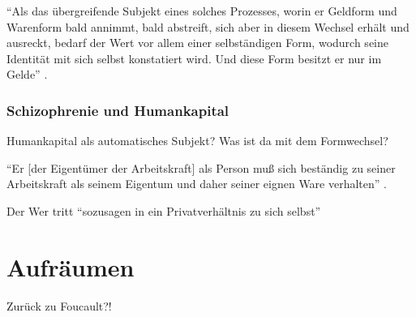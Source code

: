\documentclass[12pt,
               DIV13,
               paper=a4,
               twoside=false,
               onehalfspacing,
               bibliography=totoc,
               toc=graduated,
               draft,
               ]{scrartcl}
\newcommand{\pc}[2]{\parencite[#1]{#2}}
\begin{document}
"`Als das übergreifende Subjekt eines solches Prozesses, worin er
Geldform und Warenform bald annimmt, bald abstreift, sich aber in
diesem Wechsel erhält und ausreckt, bedarf der Wert vor allem einer
selbständigen Form, wodurch seine Identität mit sich selbst
konstatiert wird. Und diese Form besitzt er nur im Gelde"'
\pc{169}{kap}.

\subsubsection{Schizophrenie und Humankapital}

Humankapital als automatisches Subjekt? Was ist da mit dem
Formwechsel?

"`Er [der Eigentümer der Arbeitskraft] als Person muß sich beständig
zu seiner Arbeitskraft als seinem Eigentum und daher seiner eignen
Ware verhalten"' \pc{182}{kap}.

Der Wer tritt "`sozusagen in ein Privatverhältnis zu sich selbst"'
\pc{169}{kap}


\section{Aufräumen}

Zurück zu Foucault?!


\newpage
\nocite{*}
\printshorthands
\printbibliography
\end{document}

